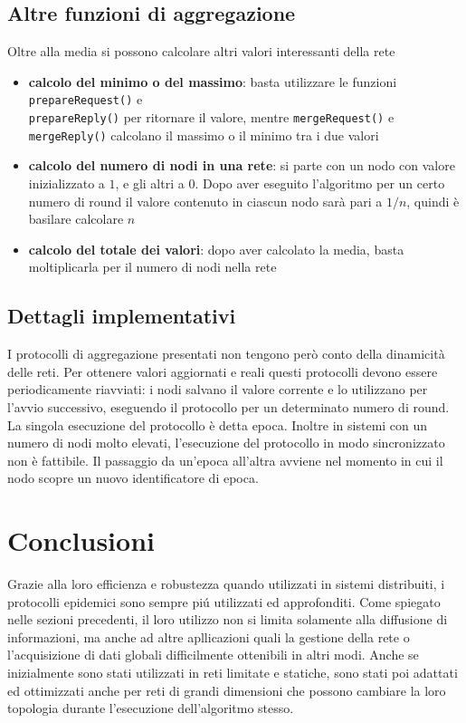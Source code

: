 \subsection{Altre funzioni di aggregazione}
Oltre alla media si possono calcolare altri valori interessanti della rete
\begin{itemize}
    \item \textbf{calcolo del minimo o del massimo}: basta utilizzare le funzioni \texttt{prepareRequest()} e \\ \texttt{prepareReply()} per ritornare il valore, mentre \texttt{mergeRequest()} e \texttt{mergeReply()} calcolano il massimo o il minimo tra i due valori
    \item \textbf{calcolo del numero di nodi in una rete}: si parte con un nodo con valore inizializzato a $1$, e gli altri  a $0$. Dopo aver eseguito l'algoritmo per un certo numero di round il valore contenuto in ciascun nodo sarà pari a $1/n$, quindi è basilare calcolare $n$
    \item \textbf{calcolo del totale dei valori}: dopo aver calcolato la media, basta moltiplicarla per il numero di nodi nella rete 
\end{itemize}
\subsection{Dettagli implementativi}
I protocolli di aggregazione presentati non tengono però conto della dinamicità delle reti. Per ottenere valori aggiornati e reali questi protocolli devono essere periodicamente riavviati: i nodi salvano il valore corrente e lo utilizzano per l'avvio successivo, eseguendo il protocollo per un determinato numero di round. La singola esecuzione del protocollo è detta epoca.
Inoltre in sistemi con un numero di nodi molto elevati, l'esecuzione del protocollo in modo sincronizzato non è fattibile. Il passaggio da un'epoca all'altra avviene nel momento in cui il nodo scopre un nuovo identificatore di epoca.
\section{Conclusioni}
Grazie alla loro efficienza e robustezza quando utilizzati in sistemi distribuiti, i protocolli epidemici sono sempre piú utilizzati ed approfonditi. Come spiegato nelle sezioni precedenti, il loro utilizzo non si limita solamente alla diffusione di informazioni, ma anche ad altre apllicazioni quali la gestione della rete o l'acquisizione di dati globali difficilmente ottenibili in altri modi. Anche se inizialmente sono stati utilizzati in reti limitate e statiche, sono stati poi adattati ed ottimizzati anche per reti di grandi dimensioni che possono cambiare la loro topologia durante l'esecuzione dell'algoritmo stesso.







